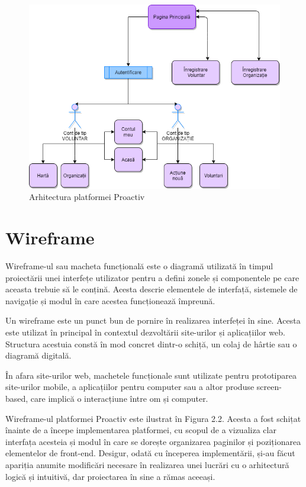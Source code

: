 \documentclass[12pt,a4paper]{report}
\begin{document}
\begin{figure}[H]
\centering
  \includegraphics[width=1\linewidth]{./imagini/arhitectura.png}
  \caption{Arhitectura platformei Proactiv}
\end{figure}

\newpage
\section{Wireframe}
\par
Wireframe-ul sau macheta funcțională este o diagramă utilizată în timpul proiectării unei interfețe utilizator pentru a defini zonele și componentele pe care aceasta trebuie să le conțină. Acesta descrie elementele de interfață, sistemele de navigație și modul în care acestea funcționează împreună.
\\\par
Un wireframe este un punct bun de pornire în realizarea interfeței în sine. Acesta este utilizat în principal în contextul dezvoltării site-urilor și aplicațiilor web. Structura acestuia constă în mod concret dintr-o schiță, un colaj de hârtie sau o diagramă digitală.
\\\par
În afara site-urilor web, machetele funcționale sunt utilizate pentru prototiparea site-urilor mobile, a aplicațiilor pentru computer sau a altor produse screen-based, care implică o interacțiune între om și computer.
\\\par
Wireframe-ul platformei Proactiv este ilustrat în Figura 2.2. Acesta a fost schițat înainte de a începe implementarea platformei, cu scopul de a vizualiza clar interfața acesteia și modul în care se dorește organizarea paginilor și poziționarea elementelor de front-end. 
Desigur, odată cu începerea implementării, și-au făcut apariția anumite modificări necesare în realizarea unei lucrări cu o arhitectură logică și intuitivă, dar proiectarea în sine a rămas aceeași.
\end{document}
